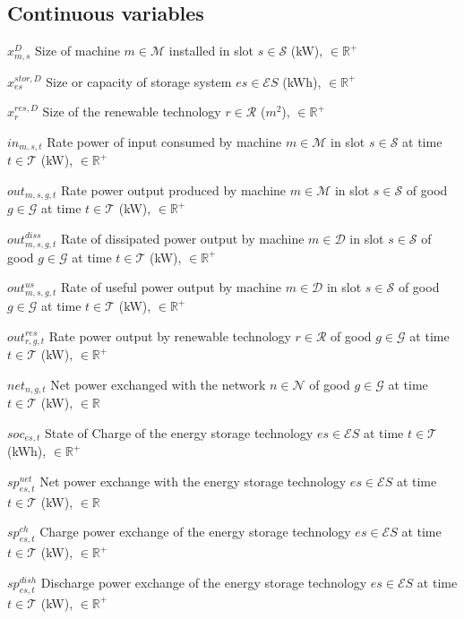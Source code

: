 \documentclass{article}
\newcommand{\cT}{{\mathcal T}}
\newcommand{\cM}{{\mathcal M}}
\newcommand{\cP}{{\mathcal P}}
\newcommand{\cQ}{{\mathcal Q}}
\newcommand{\cC}{{\mathcal C}}
\newcommand{\cD}{{\mathcal D}}
\newcommand{\cS}{{\mathcal S}}
\newcommand{\cR}{{\mathcal R}}
\newcommand{\cES}{{\mathcal ES}}
\newcommand{\cN}{{\mathcal N}}
\newcommand{\cG}{{\mathcal G}}
\newcommand{\bbR}{{\mathbb R}}
\newcommand\mydescriptionopt{
	\IEEEsetlabelwidth{$g \in \cG_{\textit{off}}^0$]}
	\IEEEusemathlabelsep
}
\begin{document}
\subsection{Continuous variables}
\begin{IEEEdescription}[\mydescriptionopt]
	\item[$x_{m, s}^D$] Size of machine $m \in \cM$ installed in slot $s \in \cS$ (kW), $\in \bbR^+$
	\item[$x_{es}^{stor, D}$] Size or capacity of storage system $es \in \cES$ (kWh), $\in \bbR^+$
	\item[$x_{r}^{res, D}$] Size of the renewable technology $r \in \cR$ ($m^2$), $\in \bbR^+$
	\item[$in_{m, s, t}$] Rate power of input consumed by machine $m \in \cM$ in slot $s \in \cS$ at time $t \in \cT$ (kW), $\in \bbR^+$
	\item[$out_{m, s, g, t}$] Rate power output produced by machine $m \in \cM$ in slot $s \in \cS$ of good $g \in \cG$ at time $t \in \cT$ (kW), $\in \bbR^+$
	\item[$out_{m, s, g, t}^{diss}$] Rate of dissipated power output by machine $m \in \cD$ in slot $s \in \cS$ of good $g \in \cG$ at time $t \in \cT$ (kW), $\in \bbR^+$
	\item[$out_{m, s, g, t}^{us}$] Rate of useful power output by machine $m \in \cD$ in slot $s \in \cS$ of good $g \in \cG$ at time $t \in \cT$ (kW), $\in \bbR^+$
	\item[$out_{r, g, t}^{res}$] Rate power output by renewable technology $r \in \cR$ of good $g \in \cG$ at time $t \in \cT$ (kW), $\in \bbR^+$
	
	\item[$net_{n, g, t}$] Net power exchanged with the network $n \in \cN$ of good $g \in \cG$ at time $t \in \cT$ (kW), $\in \bbR$
	
	\item[$soc_{es, t}$] State of Charge of the energy storage technology $es \in \cES$ at time $t \in \cT$ (kWh), $\in \bbR^+$
	\item[$sp_{es, t}^{net}$] Net power exchange with the energy storage technology $es \in \cES$ at time $t \in \cT$ (kW), $\in \bbR$
	\item[$sp_{es, t}^{ch}$] Charge power exchange of the energy storage technology $es \in \cES$ at time $t \in \cT$ (kW), $\in \bbR^+$
	\item[$sp_{es, t}^{dish}$] Discharge power exchange of the energy storage technology $es \in \cES$ at time $t \in \cT$ (kW), $\in \bbR^+$
	

\end{IEEEdescription}
\end{document}
